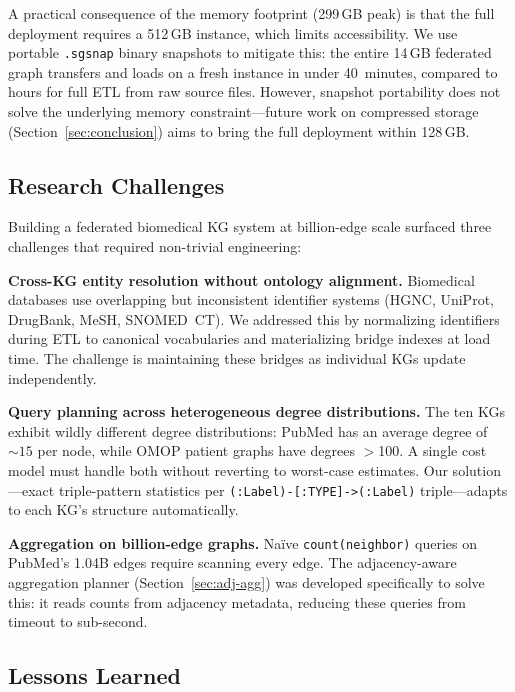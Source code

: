 \documentclass[runningheads]{llncs}
\begin{document}
A practical consequence of the memory footprint (299\,GB peak) is
that the full deployment requires a 512\,GB instance, which limits
accessibility.  We use portable \texttt{.sgsnap} binary snapshots
to mitigate this: the entire 14\,GB federated graph transfers and
loads on a fresh instance in under 40~minutes, compared to hours
for full ETL from raw source files.  However, snapshot portability
does not solve the underlying memory constraint---future work on
compressed storage (Section~\ref{sec:conclusion}) aims to bring the
full deployment within 128\,GB.

\subsection{Research Challenges}

Building a federated biomedical KG system at billion-edge scale
surfaced three challenges that required non-trivial engineering:

\smallskip\noindent\textbf{Cross-KG entity resolution without ontology alignment.}
Biomedical databases use overlapping but inconsistent identifier
systems (HGNC, UniProt, DrugBank, MeSH, SNOMED~CT).  We addressed
this by normalizing identifiers during ETL to canonical
vocabularies and materializing bridge indexes at load time.  The
challenge is maintaining these bridges as individual KGs update
independently.

\smallskip\noindent\textbf{Query planning across heterogeneous degree distributions.}
The ten KGs exhibit wildly different degree distributions: PubMed
has an average degree of ${\sim}15$ per node, while OMOP patient
graphs have degrees $>$100.  A single cost model must handle both
without reverting to worst-case estimates.  Our solution---exact
triple-pattern statistics per \texttt{(:Label)-[:TYPE]->(:Label)}
triple---adapts to each KG's structure automatically.

\smallskip\noindent\textbf{Aggregation on billion-edge graphs.}
Na\"ive \texttt{count(neighbor)} queries on PubMed's 1.04B edges
require scanning every edge.  The adjacency-aware aggregation
planner (Section~\ref{sec:adj-agg}) was developed specifically
to solve this: it reads counts from adjacency metadata, reducing
these queries from timeout to sub-second.

\subsection{Lessons Learned}
\end{document}
